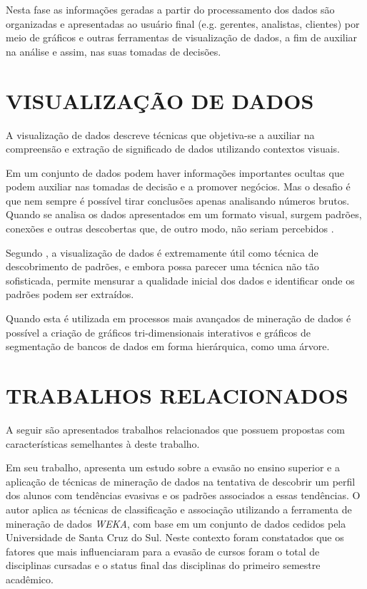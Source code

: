 Nesta fase as informações geradas a partir do processamento dos dados são organizadas e apresentadas ao usuário final (e.g. gerentes, analistas, clientes) por meio de gráficos e outras ferramentas de visualização de dados, a fim de auxiliar na análise e assim, nas suas tomadas de decisões.

\section{VISUALIZAÇÃO DE DADOS}

A visualização de dados descreve técnicas que objetiva-se a auxiliar na compreensão e extração de significado de dados utilizando contextos visuais.

Em um conjunto de dados podem haver informações importantes ocultas que podem auxiliar nas tomadas de decisão e a promover negócios.
Mas o desafio é que nem sempre é possível tirar conclusões apenas analisando números brutos.
Quando se analisa os dados apresentados em um formato visual, surgem padrões, conexões e outras descobertas que, de outro modo, não seriam percebidos \cite{Microsoft2018}.

Segundo , a visualização de dados é extremamente útil como técnica de descobrimento de padrões, e embora possa parecer uma técnica não tão sofisticada, permite mensurar a qualidade inicial dos dados e identificar onde os padrões podem ser extraídos. 

Quando esta é utilizada em processos mais avançados de mineração de dados é possível a criação de gráficos tri-dimensionais interativos e gráficos de segmentação de bancos de dados em forma hierárquica, como uma árvore.

\section{TRABALHOS RELACIONADOS}
\label{sec:trabalhosRelacionados}

A seguir são apresentados trabalhos relacionados que possuem propostas com características semelhantes à deste trabalho.

Em seu trabalho,  apresenta um estudo sobre a evasão no ensino superior e a aplicação de técnicas de mineração de dados na tentativa de descobrir um perfil dos alunos com tendências evasivas e os padrões associados a essas tendências. 
O autor aplica as técnicas de classificação e associação utilizando a ferramenta de mineração de dados \textit{WEKA}, com base em um conjunto de dados cedidos pela Universidade de Santa Cruz do Sul. 
Neste contexto foram constatados que os fatores que mais influenciaram para a evasão de cursos foram o total de disciplinas cursadas e o status final das disciplinas do primeiro semestre acadêmico. 


